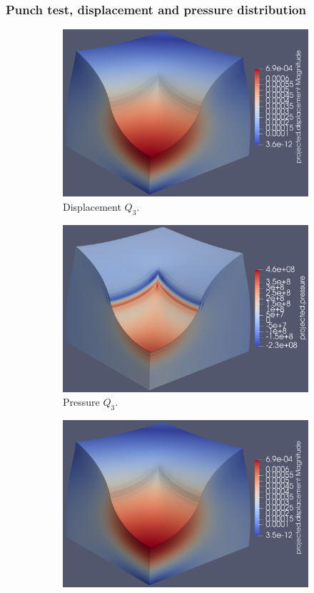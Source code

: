 \documentclass{beamer}
\begin{document}
\begin{frame}
	\frametitle{Punch test, displacement and pressure distribution}
	\begin{figure}[H]
		\begin{subfigure}{.5\textwidth}
			\centering
			\includegraphics[width=.68\textwidth]{../figs/u-Q3-320MPa-0.495.png}
			\caption{Displacement $Q_3$.}
		\end{subfigure}%
		\begin{subfigure}{.5\textwidth}
			\centering
			\includegraphics[width=.68\textwidth]{../figs/p-Q3-320MPa-0.495.png}
			\caption{Pressure $Q_3$.}
		\end{subfigure}
		\begin{subfigure}{.5\textwidth}
			\centering
			\includegraphics[width=.68\textwidth]{../figs/u-Q3Q2-320MPa-0.495.png}

\end{subfigure}
\end{figure}
\end{frame}
\end{document}
